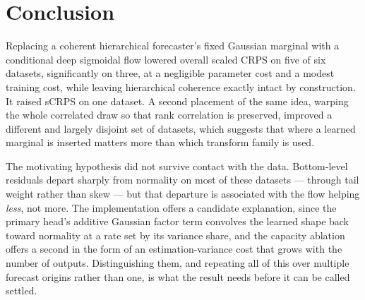 \documentclass[11pt]{article}
\begin{document}
\section{Conclusion}

Replacing a coherent hierarchical forecaster's fixed Gaussian marginal with a
conditional deep sigmoidal flow lowered overall scaled CRPS on five of six datasets,
significantly on three, at a negligible parameter cost and a modest training cost,
while leaving hierarchical coherence exactly intact by construction. It raised sCRPS
on one dataset. A second placement of the same idea, warping the whole correlated
draw so that rank correlation is preserved, improved a different and largely disjoint
set of datasets, which suggests that where a learned marginal is inserted matters
more than which transform family is used.

The motivating hypothesis did not survive contact with the data. Bottom-level
residuals depart sharply from normality on most of these datasets --- through tail
weight rather than skew --- but that departure is associated with the flow helping
\emph{less}, not more. The implementation offers a candidate explanation, since the
primary head's additive Gaussian factor term convolves the learned shape back toward
normality at a rate set by its variance share, and the capacity ablation offers a
second in the form of an estimation-variance cost that grows with the number of
outputs. Distinguishing them, and repeating all of this over multiple forecast
origins rather than one, is what the result needs before it can be called settled.



\end{document}
